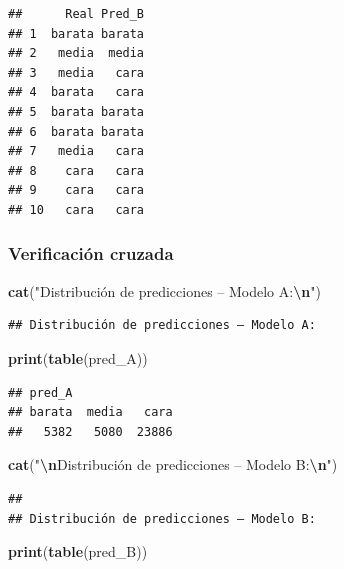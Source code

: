 \documentclass[
]{article}
\newenvironment{Shaded}{\begin{snugshade}}{\end{snugshade}}
\newcommand{\FunctionTok}[1]{\textcolor[rgb]{0.13,0.29,0.53}{\textbf{#1}}}
\newcommand{\NormalTok}[1]{#1}
\newcommand{\SpecialCharTok}[1]{\textcolor[rgb]{0.81,0.36,0.00}{\textbf{#1}}}
\newcommand{\StringTok}[1]{\textcolor[rgb]{0.31,0.60,0.02}{#1}}
\begin{document}
\begin{verbatim}
##      Real Pred_B
## 1  barata barata
## 2   media  media
## 3   media   cara
## 4  barata   cara
## 5  barata barata
## 6  barata barata
## 7   media   cara
## 8    cara   cara
## 9    cara   cara
## 10   cara   cara
\end{verbatim}

\hypertarget{verificaciuxf3n-cruzada}{%
\subsubsection{Verificación cruzada}\label{verificaciuxf3n-cruzada}}

\begin{Shaded}
\begin{Highlighting}[]
\FunctionTok{cat}\NormalTok{(}\StringTok{"Distribución de predicciones – Modelo A:}\SpecialCharTok{\textbackslash{}n}\StringTok{"}\NormalTok{)}
\end{Highlighting}
\end{Shaded}

\begin{verbatim}
## Distribución de predicciones – Modelo A:
\end{verbatim}

\begin{Shaded}
\begin{Highlighting}[]
\FunctionTok{print}\NormalTok{(}\FunctionTok{table}\NormalTok{(pred\_A))}
\end{Highlighting}
\end{Shaded}

\begin{verbatim}
## pred_A
## barata  media   cara 
##   5382   5080  23886
\end{verbatim}

\begin{Shaded}
\begin{Highlighting}[]
\FunctionTok{cat}\NormalTok{(}\StringTok{"}\SpecialCharTok{\textbackslash{}n}\StringTok{Distribución de predicciones – Modelo B:}\SpecialCharTok{\textbackslash{}n}\StringTok{"}\NormalTok{)}
\end{Highlighting}
\end{Shaded}

\begin{verbatim}
## 
## Distribución de predicciones – Modelo B:
\end{verbatim}

\begin{Shaded}
\begin{Highlighting}[]
\FunctionTok{print}\NormalTok{(}\FunctionTok{table}\NormalTok{(pred\_B))}
\end{Highlighting}
\end{Shaded}
\end{document}
